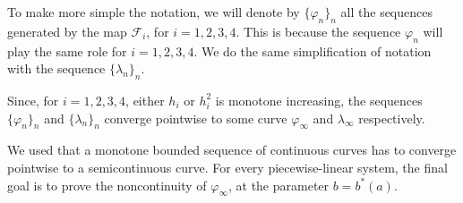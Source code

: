 \documentclass[12pt]{article}
\theoremstyle{plain}
\theoremstyle{remark}
\theoremstyle{definition}
\begin{document}
To make more simple the notation, we will denote by $\{\varphi_n\}_n$ all the sequences generated by the map $\mathcal{F}_i$, for $i=1,2,3,4$. This is because the sequence $\varphi_n$ will play the same role for $i=1,2,3,4$. We do the same simplification of notation with the sequence $\{\lambda_n\}_n$. 

Since, for $i=1,2,3,4$, either $h_i$ or $h_i^2$ is monotone increasing, the sequences $\{\varphi_n\}_n$ and $\{\lambda_n\}_n$ converge pointwise to some curve $\varphi_\infty$ and $\lambda_\infty$ respectively. 

We used that a monotone bounded sequence of continuous curves has to converge pointwise to a semicontinuous curve. For every piecewise-linear system, the final goal is to prove the noncontinuity of $\varphi_\infty$, at the parameter $b=b^*(a)$.
\end{document}
